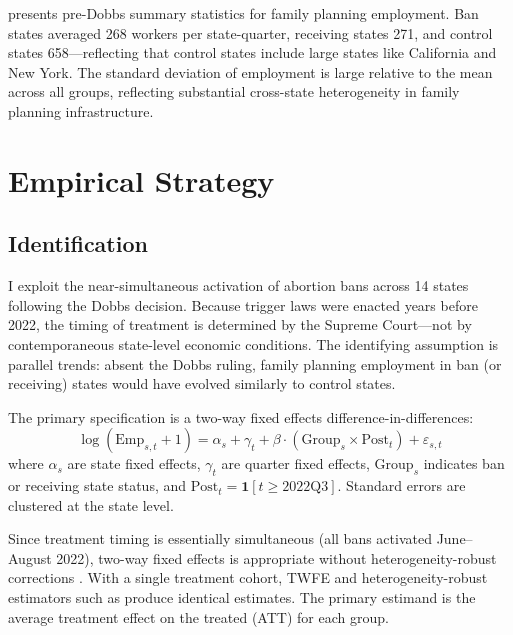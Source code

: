 \documentclass[12pt]{article}
\begin{document}


 presents pre-Dobbs summary statistics for family planning employment. Ban states averaged 268 workers per state-quarter, receiving states 271, and control states 658---reflecting that control states include large states like California and New York. The standard deviation of employment is large relative to the mean across all groups, reflecting substantial cross-state heterogeneity in family planning infrastructure.


\section{Empirical Strategy}
\label{sec:strategy}

\subsection{Identification}

I exploit the near-simultaneous activation of abortion bans across 14 states following the Dobbs decision. Because trigger laws were enacted years before 2022, the timing of treatment is determined by the Supreme Court---not by contemporaneous state-level economic conditions. The identifying assumption is parallel trends: absent the Dobbs ruling, family planning employment in ban (or receiving) states would have evolved similarly to control states.

The primary specification is a two-way fixed effects difference-in-differences:
\begin{equation}
\log(\text{Emp}_{s,t} + 1) = \alpha_s + \gamma_t + \beta \cdot (\text{Group}_s \times \text{Post}_t) + \varepsilon_{s,t}
\label{eq:twfe}
\end{equation}
where $\alpha_s$ are state fixed effects, $\gamma_t$ are quarter fixed effects, $\text{Group}_s$ indicates ban or receiving state status, and $\text{Post}_t = \mathbf{1}[t \geq \text{2022Q3}]$. Standard errors are clustered at the state level.

Since treatment timing is essentially simultaneous (all bans activated June--August 2022), two-way fixed effects is appropriate without heterogeneity-robust corrections \citep{goodmanbacon2021}. With a single treatment cohort, TWFE and heterogeneity-robust estimators such as \citet{callawaySantanna2021} produce identical estimates. The primary estimand is the average treatment effect on the treated (ATT) for each group.
\end{document}
